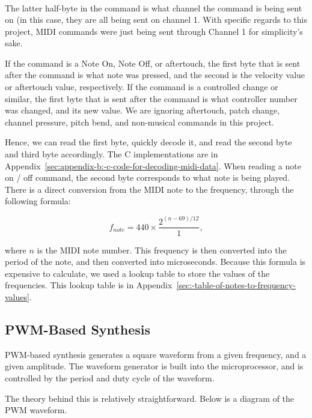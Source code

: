 \[
\begin{array}{l|l}

\end{array}
\]

The latter half-byte in the command is what channel the command is being sent on (in this case, they are all being sent on channel 1. 
With specific regards to this project, MIDI commands were just being sent through Channel 1 for simplicity's sake. 

If the command is a Note On, Note Off, or aftertouch, the first byte that is sent after the command is what note was pressed, and the second is the velocity value or aftertouch value, respectively. If the command is a controlled change or similar, the first byte that is sent after the command is what controller number was changed, and its new value. We are ignoring aftertouch, patch change, channel pressure, pitch bend, and non-musical commands in this project. 

Hence, we can read the first byte, quickly decode it, and read the second byte and third byte accordingly.
The C implementations are in Appendix~\ref{sec:appendix-b:-c-code-for-decoding-midi-data}.
When reading a note on / off command, the second byte corresponds to what note is being played.
There is a direct conversion from the MIDI note to the frequency, through the following formula:

\[
f_{note}=440\times\frac{2^{(n-69)/12}}{1},
\]

where $n$ is the MIDI note number.
This frequency is then converted into the period of the note, and then converted into microseconds.
Because this formula is expensive to calculate, we used a lookup table to store the values of the frequencies.
This lookup table is in Appendix~\ref{sec:-table-of-notes-to-frequency-values}.

\subsection{PWM-Based Synthesis}\label{subsec:pwm-based-synthesis-theory}

PWM-based synthesis generates a square waveform from a given frequency, and a given amplitude.
The waveform generator is built into the microprocessor, and is controlled by the period and duty cycle of the waveform.

The theory behind this is relatively straightforward.
Below is a diagram of the PWM waveform.

